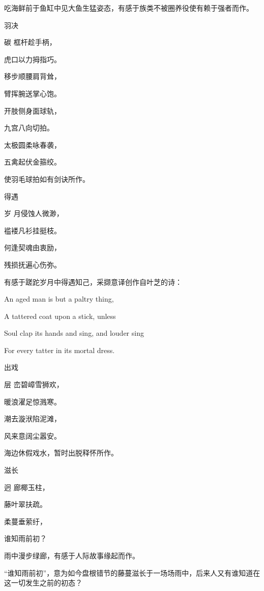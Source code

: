 \documentclass{article}
\newenvironment{poem}[3]{
\begin{minipage}{\textwidth}
\begin{pinyinscope}\begin{center}\Large\linespread{1.4}\selectfont #2\end{center}\end{pinyinscope}
\begin{pinyinscope}
	\begin{center}
	\Large\linespread{1.4}\rmfamily\selectfont #3
}{\end{center}
\end{pinyinscope}
\end{minipage}
}
\begin{document}
吃海鲜前于鱼缸中见大鱼生猛姿态，有感于族类不被圈养役使有赖于强者而作。

\begin{poem}{}{羽决}
碳框{}杆趁手柄，

虎口以力拇指巧。

移步顺腰肩背耸，

臂挥腕送掌心饱。

开肢侧身面球轨，

九宫八向切拍{}。

太极圆柔咏春袭，

五禽起伏金箍绞。
\end{poem}

使羽毛球拍如有剑诀所作。

\begin{poem}{}{得遇}
岁月侵蚀人微渺，

褴褛凡衫挂挺枝。

何逢契魂由衷励，

残损抚遍心伤弥。
\end{poem}

有感于蹉跎岁月中得遇知己，采撷意译创作自叶芝的诗：

\begin{displayquote}
An aged man is but a paltry thing,

A tattered coat upon a stick, unless

Soul clap its hands and sing, and louder sing

For every tatter in its mortal dress.
\end{displayquote}

\begin{poem}{}{出戏}
层峦碧嶂雪狮欢，

暖浪濯足惊溅寒。

潮去漩{\textsf 洑}陷泥滩，

风来意阔尘嚣安。
\end{poem}

海边休假戏水，暂时出脱释怀所作。

\begin{poem}{}{滋长}
迥廊椰玉柱，

藤叶翠扶疏。

柔蔓垂萦纡，

谁知雨前初？
\end{poem}

雨中漫步绿廊，有感于人际故事缘起而作。

“谁知雨前初”，意为如今盘根错节的藤蔓滋长于一场场雨中，后来人又有谁知道在这一切发生之前的初态？
\end{document}
